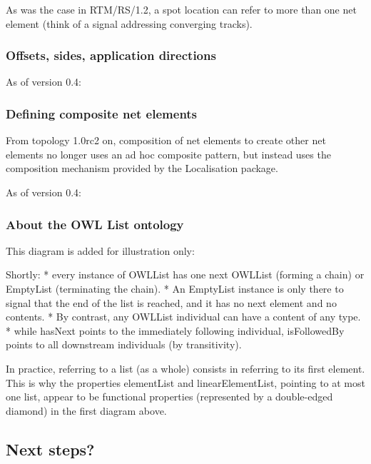 \documentclass[
  11pt,
]{article}
\begin{document}
As was the case in RTM/RS/1.2, a spot location can refer to more than
one net element (think of a signal addressing converging tracks).

\hypertarget{offsets-sides-application-directions}{%
\subsubsection{Offsets, sides, application
directions}\label{offsets-sides-application-directions}}

As of version 0.4:

\hypertarget{defining-composite-net-elements}{%
\subsubsection{Defining composite net
elements}\label{defining-composite-net-elements}}

From topology 1.0rc2 on, composition of net elements to create other net
elements no longer uses an ad hoc composite pattern, but instead uses
the composition mechanism provided by the Localisation package.

As of version 0.4:

\hypertarget{about-the-owl-list-ontology}{%
\subsubsection{About the OWL List
ontology}\label{about-the-owl-list-ontology}}

This diagram is added for illustration only:

Shortly: * every instance of OWLList has one next OWLList (forming a
chain) or EmptyList (terminating the chain). * An EmptyList instance is
only there to signal that the end of the list is reached, and it has no
next element and no contents. * By contrast, any OWLList individual can
have a content of any type. * while hasNext points to the immediately
following individual, isFollowedBy points to all downstream individuals
(by transitivity).

In practice, referring to a list (as a whole) consists in referring to
its first element. This is why the properties elementList and
linearElementList, pointing to at most one list, appear to be functional
properties (represented by a double-edged diamond) in the first diagram
above.

\hypertarget{next-steps}{%
\subsection{Next steps?}\label{next-steps}}
\end{document}
